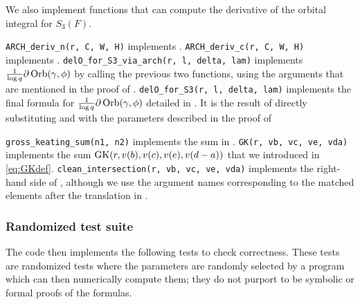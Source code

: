We also implement functions that can compute the
derivative of the orbital integral for $S_3(F)$.

\begin{itemize}
  \ii \texttt{ARCH\_deriv\_n(r, C, W, H)} implements .
  \ii \texttt{ARCH\_deriv\_c(r, C, W, H)} implements .
  \ii \texttt{delO\_for\_S3\_via\_arch(r, l, delta, lam)} implements
  $\frac{1}{\log q}\partial\operatorname{Orb}(\gamma, \phi)$
  by calling the previous two functions,
  using the arguments that are mentioned in the proof of .
  \ii \texttt{delO\_for\_S3(r, l, delta, lam)} implements the final formula for
  $\frac{1}{\log q}\partial\operatorname{Orb}(\gamma, \phi)$
  detailed in .
  It is the result of directly substituting  and 
  with the parameters described in the proof of 
\end{itemize}

\begin{itemize}
  \ii \texttt{gross\_keating\_sum(n1, n2)} implements the sum in .
  \ii \texttt{GK(r, vb, vc, ve, vda)} implements the sum $\operatorname{GK}(r, v(b), v(c), v(e), v(d-a))$
  that we introduced in \eqref{eq:GKdef}.
  \ii \texttt{clean\_intersection(r, vb, vc, ve, vda)} implements the
  right-hand side of ,
  although we use the argument names corresponding to the matched elements
  after the translation in .
\end{itemize}

\subsubsection{Randomized test suite}
The code then implements the following tests to check correctness.
These tests are randomized tests where the parameters are randomly selected by a program
which can then numerically compute them;
they do not purport to be symbolic or formal proofs of the formulas.

